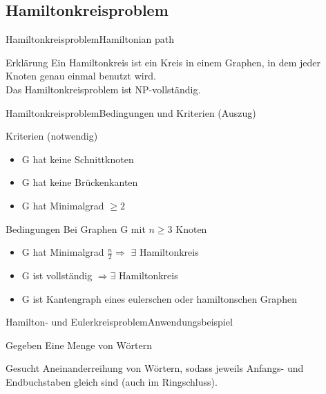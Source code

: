 \subsection{Hamiltonkreisproblem}

\begin{frame}{Hamiltonkreisproblem}{Hamiltonian path}
	\begin{block}{Erklärung}
		Ein Hamiltonkreis ist ein Kreis in einem Graphen, in dem jeder Knoten genau einmal benutzt wird.\\

		Das Hamiltonkreisproblem ist NP-vollständig.
	\end{block}
\end{frame}

\begin{frame}{Hamiltonkreisproblem}{Bedingungen und Kriterien (Auszug)}
	\begin{block}{Kriterien (notwendig)}
		\begin{itemize}
			\item G hat keine Schnittknoten
			\item G hat keine Brückenkanten
			\item G hat Minimalgrad $\geq 2$
		\end{itemize}
	\end{block}
	\begin{block}{Bedingungen}
		Bei Graphen G mit $n \geq 3$ Knoten
		\begin{itemize}
			\item G hat Minimalgrad $\frac{n}{2} \Rightarrow$ $\exists $ Hamiltonkreis
			\item G ist vollständig $\Rightarrow \exists$ Hamiltonkreis
			\item G ist Kantengraph eines eulerschen oder hamiltonschen Graphen
		\end{itemize}
	\end{block}
\end{frame}

\begin{frame}{Hamilton- und Eulerkreisproblem}{Anwendungsbeispiel}
	\begin{block}{Gegeben}
		Eine Menge von Wörtern
	\end{block}
	\begin{block}{Gesucht}
		Aneinanderreihung von Wörtern, sodass jeweils Anfangs- und Endbuchstaben gleich sind
		(auch im Ringschluss).
	\end{block}
\end{frame}


